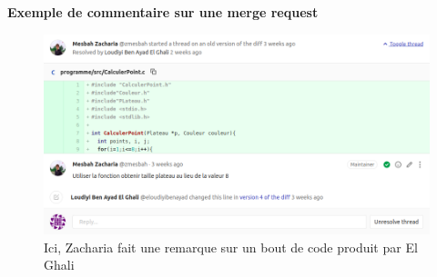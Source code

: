 \begin{center}
\textbf{Exemple de commentaire sur une merge request}
\end{center}
\begin{figure}[h]
  \includegraphics[width=18cm]{./sourcesIMAGES/exempleMergeRequest.png}
  \caption{Ici, Zacharia fait une remarque sur un bout de code produit par El Ghali}
\end{figure}
